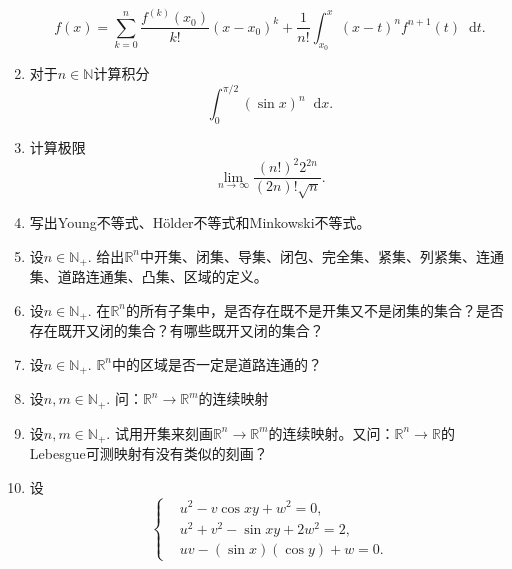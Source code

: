 \documentclass{ctexart}
\newcommand{\differential}{\mathop{}\!\mathrm{d}}
\newcommand{\realset}{\mathbb{R}}
\newcommand{\naturalset}{\mathbb{N}}
\newcommand{\positiveinteger}{\mathbb{N_+}}
\begin{document}
\begin{enumerate}
\begin{equation*}
        f(x)=\sum_{k=0}^{n}\frac{f^{(k)}\left(x_0\right)}{k!}\left(x-x_0\right)^k+\frac{1}{n!}\int_{x_0}^x (x-t)^n f^{n+1}(t)\differential t.
    \end{equation*}
    \item 对于$n\in \naturalset$计算积分\begin{equation*}
        \int_0^{\pi/2}(\sin x)^n\differential x.
    \end{equation*}
    \item 计算极限\begin{equation*}
        \lim_{n\to \infty}\frac{(n!)^2 2^{2n}}{(2n)!\sqrt{n}}.
    \end{equation*}
    \item 写出Young不等式、H\"older不等式和Minkowski不等式。
    \item 设$n\in\positiveinteger$. 给出$\realset^n$中开集、闭集、导集、闭包、完全集、紧集、列紧集、连通集、道路连通集、凸集、区域的定义。
    \item 设$n\in\positiveinteger$. 在$\realset^n$的所有子集中，是否存在既不是开集又不是闭集的集合？是否存在既开又闭的集合？有哪些既开又闭的集合？
    \item 设$n\in\positiveinteger$. $\realset^n$中的区域是否一定是道路连通的？
    \item 设$n,m\in\positiveinteger$. 问：$\realset^n\to\realset^m$的连续映射\\
    \item 设$n,m\in\positiveinteger$. 试用开集来刻画$\realset^n\to\realset^m$的连续映射。又问：$\realset^n\to\realset$的Lebesgue可测映射有没有类似的刻画？
    \item 设\begin{equation*}
        \left\{\begin{aligned}
            &u^2-v\cos xy+w^2=0,\\
            &u^2+v^2-\sin xy+2w^2=2,\\
            &uv-(\sin x)(\cos y)+w=0.
        \end{aligned}\right.

\end{equation*}
\end{enumerate}
\end{document}
